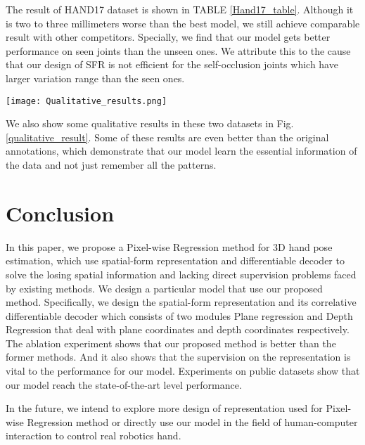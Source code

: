 \documentclass[journal]{IEEEtran}
\begin{document}
The result of HAND17 dataset is shown in TABLE \ref{Hand17_table}. 
Although it is two to three millimeters worse than the best model, we still achieve comparable result with other competitors. 
Specially, we find that our model gets better performance on seen joints than the unseen ones. 
We attribute this to the cause that our design of SFR is not efficient for the self-occlusion joints which have larger variation range than the seen ones. 

\begin{figure*}[!t]
  \centering
  \texttt{[image: Qualitative\_results.png]}
  \caption{
    Qualitative results of our model. (a), (b), (c) shows the result form MSRA, ICVL, HAND17 dataset respectively. 
    Specially, in (a) and (b) we provide ground truth in the second row for comparison.
  }
  \label{qualitative_result}
\end{figure*}

We also show some qualitative results in these two datasets in Fig\@. \ref{qualitative_result}. 
Some of these results are even better than the original annotations, 
which demonstrate that our model learn the essential information of the data and not just remember all the patterns.


\section{Conclusion}
\label{Conclusion}

In this paper, we propose a Pixel-wise Regression method for 3D hand pose estimation, 
which use spatial-form representation and differentiable decoder to solve the losing spatial information and 
lacking direct supervision problems faced by existing methods. 
We design a particular model that use our proposed method. 
Specifically, we design the spatial-form representation and its correlative differentiable decoder 
which consists of two modules Plane regression and Depth Regression 
that deal with plane coordinates and depth coordinates respectively. 
The ablation experiment shows that our proposed method is better than the former methods. 
And it also shows that the supervision on the representation is vital to the performance for our model. 
Experiments on public datasets show that our model reach the state-of-the-art level performance. 

In the future, we intend to explore more design of representation used for Pixel-wise Regression method or 
directly use our model in the field of human-computer interaction to control real robotics hand.






















\ifCLASSOPTIONcaptionsoff
  \newpage
\fi









\end{document}
